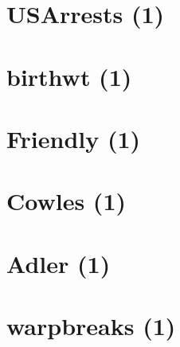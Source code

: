 \documentclass[
]{book}
\begin{document}
\hypertarget{usarrests-1}{%
\section{USArrests (1)}\label{usarrests-1}}

\hypertarget{birthwt-1}{%
\section{birthwt (1)}\label{birthwt-1}}

\hypertarget{friendly-1}{%
\section{Friendly (1)}\label{friendly-1}}

\hypertarget{cowles-1}{%
\section{Cowles (1)}\label{cowles-1}}

\hypertarget{adler-1}{%
\section{Adler (1)}\label{adler-1}}

\hypertarget{warpbreaks-1}{%
\section{warpbreaks (1)}\label{warpbreaks-1}}

  
\end{document}
